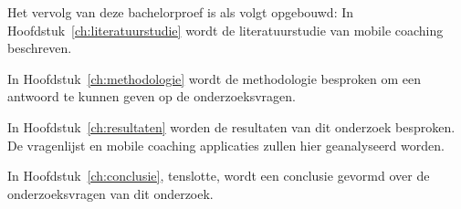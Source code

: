 Het vervolg van deze bachelorproef is als volgt opgebouwd:
In Hoofdstuk~\ref{ch:literatuurstudie}  wordt de literatuurstudie van mobile coaching beschreven.

In Hoofdstuk~\ref{ch:methodologie} wordt de methodologie besproken om een antwoord te kunnen geven op de onderzoeksvragen.

In Hoofdstuk~\ref{ch:resultaten} worden de resultaten van dit onderzoek besproken. De vragenlijst en mobile coaching applicaties zullen hier geanalyseerd worden.

In Hoofdstuk~\ref{ch:conclusie}, tenslotte, wordt een conclusie gevormd over de onderzoeksvragen van dit onderzoek.

